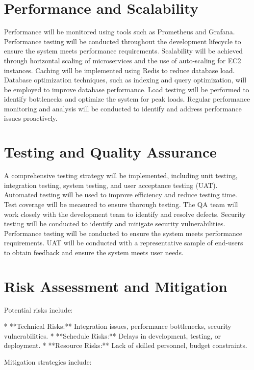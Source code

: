 \documentclass[11pt,a4paper,oneside]{article}
\begin{document}
\section{Performance and Scalability}

Performance will be monitored using tools such as Prometheus and Grafana.  Performance testing will be conducted throughout the development lifecycle to ensure the system meets performance requirements.  Scalability will be achieved through horizontal scaling of microservices and the use of auto-scaling for EC2 instances.  Caching will be implemented using Redis to reduce database load.  Database optimization techniques, such as indexing and query optimization, will be employed to improve database performance.  Load testing will be performed to identify bottlenecks and optimize the system for peak loads.  Regular performance monitoring and analysis will be conducted to identify and address performance issues proactively.

\section{Testing and Quality Assurance}

A comprehensive testing strategy will be implemented, including unit testing, integration testing, system testing, and user acceptance testing (UAT).  Automated testing will be used to improve efficiency and reduce testing time.  Test coverage will be measured to ensure thorough testing.  The QA team will work closely with the development team to identify and resolve defects.  Security testing will be conducted to identify and mitigate security vulnerabilities.  Performance testing will be conducted to ensure the system meets performance requirements.  UAT will be conducted with a representative sample of end-users to obtain feedback and ensure the system meets user needs.

\section{Risk Assessment and Mitigation}

Potential risks include:

* **Technical Risks:**  Integration issues, performance bottlenecks, security vulnerabilities.
* **Schedule Risks:** Delays in development, testing, or deployment.
* **Resource Risks:** Lack of skilled personnel, budget constraints.

Mitigation strategies include:
\end{document}
